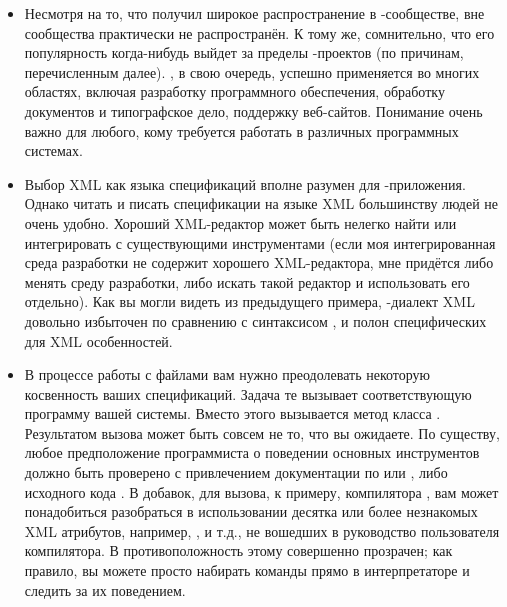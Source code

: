 \begin{itemize}
\item Несмотря на то, что  получил широкое
распространение в \Java{}\hyp{}сообществе, вне сообщества
 практически не распространён. К тому же, сомнительно,
что его популярность когда-нибудь выйдет за пределы
\Java{}\hyp{}проектов (по причинам, перечисленным далее). \GNUmake{},
в свою очередь, успешно применяется во многих областях, включая
разработку программного обеспечения, обработку документов и
типографское дело, поддержку веб\hyp{}сайтов. Понимание \GNUmake{}
очень важно для любого, кому требуется работать в различных
программных системах.
\item Выбор XML как языка спецификаций вполне разумен для
\Java{}\hyp{}приложения. Однако читать и писать спецификации на языке
XML большинству людей не очень удобно. Хороший XML\hyp{}редактор может
быть нелегко найти или интегрировать с существующими инструментами
(если моя интегрированная среда разработки не содержит хорошего
XML\hyp{}редактора, мне придётся либо менять среду разработки, либо
искать такой редактор и использовать его отдельно). Как вы могли
видеть из предыдущего примера, \hyp{}диалект XML довольно
избыточен по сравнению с синтаксисом \GNUmake{}, и полон специфических
для XML особенностей.
\item В процессе работы с файлами  вам нужно преодолевать
некоторую косвенность ваших спецификаций. Задача 
 те вызывает соответствующую программу
 вашей системы. Вместо этого вызывается метод
 класса . Результатом вызова
может быть совсем не то, что вы ожидаете. По существу, любое
предположение программиста о поведении основных инструментов
 должно быть проверено с привлечением документации по
 или \Java{}, либо исходного кода . В
добавок, для вызова, к примеру, компилятора \Java{}, вам может
понадобиться разобраться в использовании десятка или более незнакомых
XML атрибутов, например, ,  и т.д., не
вошедших в руководство пользователя компилятора. В противоположность
этому \GNUmake{} совершенно прозрачен; как правило, вы можете просто
набирать команды прямо в интерпретаторе и следить за их поведением.

\end{itemize}
